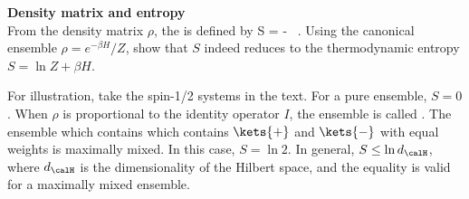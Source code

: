 \begin{prob}
\textbf{Density matrix and entropy} \\
From the density matrix $\rho$, the  is defined by
\be
%
S = - \left[ \rho \ln \rho \right]~.
%
\ee
Using the canonical ensemble $\rho=e^{-\beta H}/Z$, show that $S$ indeed reduces to the thermodynamic entropy $S=\ln Z+ \beta H$.

For illustration, take the spin-1/2 systems in the text. For a pure ensemble, $S=0$. When $\rho$ is proportional to the identity operator $I$, the ensemble is called . The ensemble which contains  which contains $\kets{+}$ and $\kets{-}$ with equal weights is maximally mixed. In this case, $S=\ln2$. In general, $S \leq \ln d_{\calH}$, where $d_{\calH}$ is the dimensionality of the Hilbert space, and the equality is valid for a maximally mixed ensemble.
\end{prob}


